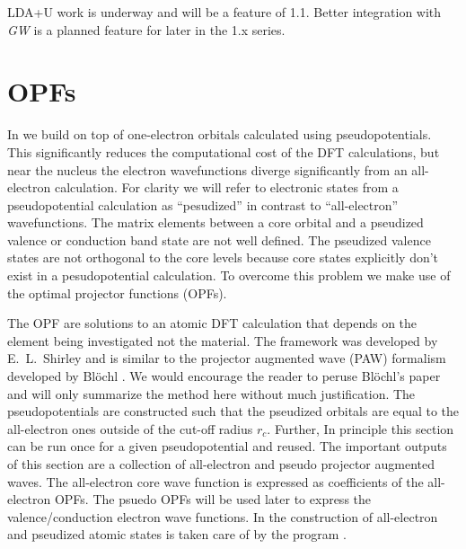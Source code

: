 \documentclass[11pt]{report}
\begin{document}
LDA+U work is underway and will be a feature of  1.1. Better integration with {\it GW} is a planned feature for later in the 1.x series. 


\chapter{OPFs}
\label{opf}

In  we build on top of one-electron orbitals calculated using pseudopotentials. 
This significantly reduces the computational cost of the DFT calculations, but near the nucleus the electron wavefunctions diverge significantly from an all-electron calculation. 
For clarity we will refer to electronic states from a pseudopotential calculation as ``pesudized'' in contrast to ``all-electron'' wavefunctions. 
The matrix elements between a core orbital and a pseudized valence or conduction band state are not well defined. 
The pseudized valence states are not orthogonal to the core levels because core states explicitly don't exist in a pesudopotential calculation.
To overcome this problem we make use of the optimal projector functions (OPFs). 

The OPF are solutions to an atomic DFT calculation that depends on the element being investigated not the material. 
The framework was developed by E.\ L.\ Shirley \cite{ShirleyOPF} and is similar to the projector augmented wave (PAW) formalism developed by Bl\"{o}chl \cite{PhysRevB.50.17953}. 
%
We would encourage the reader to peruse Bl\"{o}chl's paper and will only summarize the method here without much justification.
The pseudopotentials are constructed such that the pseudized orbitals are equal to the all-electron ones outside of the cut-off radius $r_c$. 
Further,  
In principle this section can be run once for a given pseudopotential and reused. 
The important outputs of this section are a collection of all-electron and pseudo projector augmented waves. 
The all-electron core wave function is expressed as coefficients of the all-electron OPFs. 
The psuedo OPFs will be used later to express the valence/conduction electron wave functions.
%
In  
the construction of all-electron and pseudized atomic states is taken care of by the program . 
\end{document}
